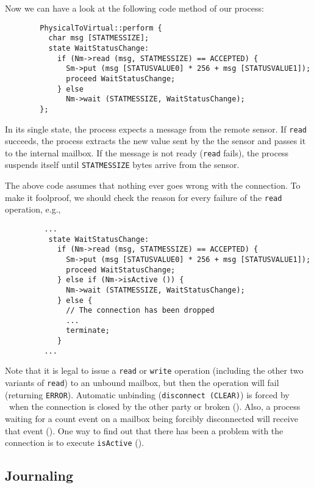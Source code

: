 Now we can have a look at the following code method of our process:
\begin{verbatim}
        PhysicalToVirtual::perform {
          char msg [STATMESSIZE];
          state WaitStatusChange:
            if (Nm->read (msg, STATMESSIZE) == ACCEPTED) {
              Sm->put (msg [STATUSVALUE0] * 256 + msg [STATUSVALUE1]);
              proceed WaitStatusChange;
            } else
              Nm->wait (STATMESSIZE, WaitStatusChange);
        };
\end{verbatim}

In its single state, the process expects a message from the remote sensor.
If {\tt read} succeeds, the process extracts the new value sent by the
the sensor and passes it to the internal mailbox.
If the message is not ready ({\tt read} fails),
the process suspends itself until {\tt STATMESSIZE} bytes arrive from
the sensor.

The above code assumes that nothing ever goes wrong with the connection.
To make it foolproof, we should check the reason for every failure of the
{\tt read} operation, e.g.,

\begin{verbatim}
         ...
          state WaitStatusChange:
            if (Nm->read (msg, STATMESSIZE) == ACCEPTED) {
              Sm->put (msg [STATUSVALUE0] * 256 + msg [STATUSVALUE1]);
              proceed WaitStatusChange;
            } else if (Nm->isActive ()) {
              Nm->wait (STATMESSIZE, WaitStatusChange);
            } else {
              // The connection has been dropped
              ...
              terminate;
            }
         ...
\end{verbatim}

\medskip

\noindent
Note that it is legal to issue a {\tt read} or {\tt write} operation
(including the other two variants of {\tt read}) to an unbound mailbox,
but then the operation will fail (returning {\tt ERROR}).
Automatic unbinding ({\tt disconnect~(CLEAR)}) is forced by \smurph\ when
the connection is closed by the other party or broken ().
Also, a process waiting for a count event on a mailbox being forcibly
disconnected will receive that event ().
One way to find out that there has been a problem with the connection is to
execute {\tt isActive} ().

\subsection{Journaling}
\label{rm_mb_ju}

